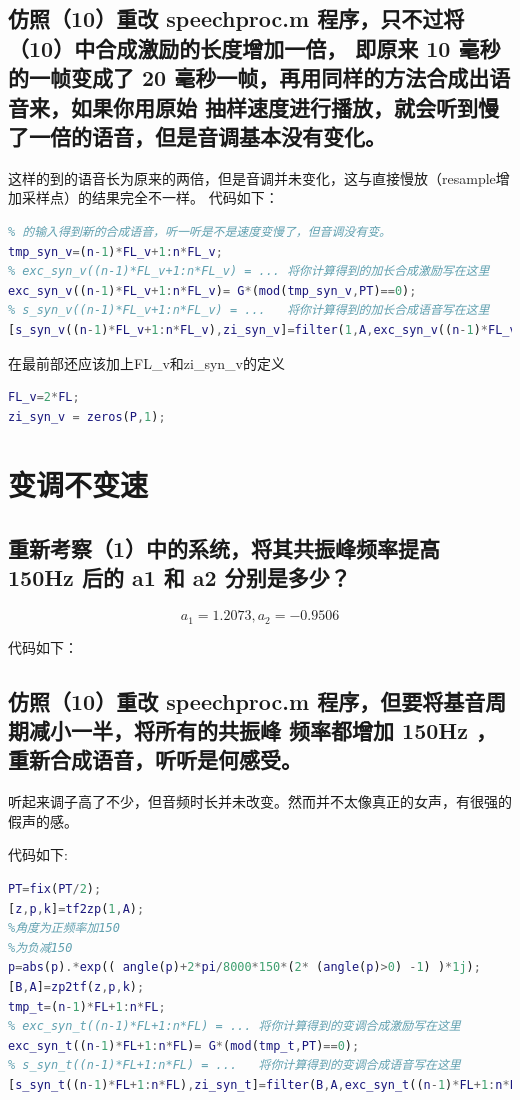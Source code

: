 \documentclass{ctexart}
\begin{document}
\subsection{
仿照（10）重改 speechproc.m 程序，只不过将（10）中合成激励的长度增加一倍，
即原来 10 毫秒的一帧变成了 20 毫秒一帧，再用同样的方法合成出语音来，如果你用原始
抽样速度进行播放，就会听到慢了一倍的语音，但是音调基本没有变化。
}    
这样的到的语音长为原来的两倍，但是音调并未变化，这与直接慢放（resample增加采样点）的结果完全不一样。
代码如下：
\begin{lstlisting}[language=matlab]
% (11) 不改变基音周期和预测系数，将合成激励的长度增加一倍，再作为filter
% 的输入得到新的合成语音，听一听是不是速度变慢了，但音调没有变。
tmp_syn_v=(n-1)*FL_v+1:n*FL_v;
% exc_syn_v((n-1)*FL_v+1:n*FL_v) = ... 将你计算得到的加长合成激励写在这里
exc_syn_v((n-1)*FL_v+1:n*FL_v)= G*(mod(tmp_syn_v,PT)==0);
% s_syn_v((n-1)*FL_v+1:n*FL_v) = ...   将你计算得到的加长合成语音写在这里
[s_syn_v((n-1)*FL_v+1:n*FL_v),zi_syn_v]=filter(1,A,exc_syn_v((n-1)*FL_v+1:n*FL_v),zi_syn_v);
\end{lstlisting}

在最前部还应该加上FL\_v和zi\_syn\_v的定义
\begin{lstlisting}[language=matlab]
FL_v=2*FL;
zi_syn_v = zeros(P,1);
\end{lstlisting}
\section{变调不变速}
\setcounter{subsection}{11} 

\subsection{
重新考察（1）中的系统，将其共振峰频率提高 150Hz 后的 a1 和 a2 分别是多少？
}
\[a_1=1.2073,a_2=-0.9506\]

代码如下：


\subsection{
仿照（10）重改 speechproc.m 程序，但要将基音周期减小一半，将所有的共振峰
频率都增加 150Hz ，重新合成语音，听听是何感受。
}
听起来调子高了不少，但音频时长并未改变。然而并不太像真正的女声，有很强的假声的感。

代码如下:
\begin{lstlisting}[language=matlab]
% (13) 将基音周期减小一半，将共振峰频率增加150Hz，重新合成语音，听听是啥感受～
PT=fix(PT/2);
[z,p,k]=tf2zp(1,A);
%角度为正频率加150
%为负减150
p=abs(p).*exp(( angle(p)+2*pi/8000*150*(2* (angle(p)>0) -1) )*1j);
[B,A]=zp2tf(z,p,k);
tmp_t=(n-1)*FL+1:n*FL;
% exc_syn_t((n-1)*FL+1:n*FL) = ... 将你计算得到的变调合成激励写在这里
exc_syn_t((n-1)*FL+1:n*FL)= G*(mod(tmp_t,PT)==0);
% s_syn_t((n-1)*FL+1:n*FL) = ...   将你计算得到的变调合成语音写在这里
[s_syn_t((n-1)*FL+1:n*FL),zi_syn_t]=filter(B,A,exc_syn_t((n-1)*FL+1:n*FL),zi_syn_t);
\end{lstlisting}
\end{document}
